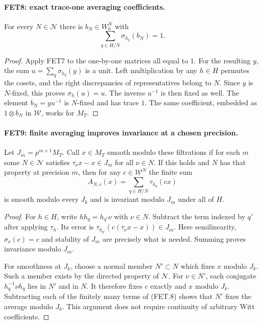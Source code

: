 \documentclass[11pt,a4paper]{article}
\numberwithin{equation}{section}
\theoremstyle{remark}\newtheorem{remark}[theorem]{Remark}
\begin{document}
\paragraph{FET8: exact trace-one averaging coefficients.}
\label{claim:FET8}
For every $N\in\mathcal N$ there is $b_N\in W_0^N$ with
\[
                      \sum_{q\in H/N}\sigma_{h_q}(b_N)=1.
                                                               \tag{FET.7}
\]

\begin{proof}
Apply FET7 to the one-by-one matrices all equal to $1$.
For the resulting $y$, the sum $u=\sum_q\sigma_{h_q}(y)$ is
a unit. Left multiplication by any $h\in H$ permutes the cosets,
and the right discrepancies of representatives belong to $N$.
Since $y$ is $N$-fixed, this proves $\sigma_h(u)=u$.
The inverse $u^{-1}$ is then fixed as well.
The element $b_N=yu^{-1}$ is $N$-fixed and has trace $1$.
The same coefficient, embedded as $1\otimes b_N$ in
$\mathcal W$, works for $M_T$.
\end{proof}

\paragraph{FET9: finite averaging improves invariance at a chosen precision.}
\label{claim:FET9}
Let $J_m=p^{m+1}M_T$. Call $x\in M_T$ smooth modulo these
filtrations if for each $m$ some $N\in\mathcal N$ satisfies
$\tau_\nu x-x\in J_m$ for all $\nu\in N$.
If this holds and $N$ has that property at precision $m$, then
for any $c\in\mathcal W^N$ the finite sum
\[
                    A_{N,c}(x)=\sum_{q\in H/N}\tau_{h_q}(cx)
                                                               \tag{FET.8}
\]
is smooth modulo every $J_k$ and is invariant modulo $J_m$
under all of $H$.

\begin{proof}
For $h\in H$, write $hh_q=h_{q'}\nu$ with $\nu\in N$.
Subtract the term indexed by $q'$ after applying $\tau_h$.
Its error is $\tau_{h_{q'}}(c(\tau_\nu x-x))\in J_m$.
Here semilinearity, $\sigma_\nu(c)=c$ and stability of $J_m$
are precisely what is needed. Summing proves invariance modulo
$J_m$.

For smoothness at $J_k$, choose a normal member $N'\subset N$
which fixes $x$ modulo $J_k$. Such a member exists by the
directed property of $\mathcal N$. For $\nu\in N'$, each
conjugate $h_q^{-1}\nu h_q$ lies in $N'$ and in $N$.
It therefore fixes $c$ exactly and $x$ modulo $J_k$.
Subtracting each of the finitely many terms of (FET.8) shows
that $N'$ fixes the average modulo $J_k$. This argument does
not require continuity of arbitrary Witt coefficients.
\end{proof}
\end{document}
